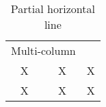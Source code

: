 \documentclass[11pt]{article}
\begin{document}
 
\begin{table}[ht]
	\caption{Partial horizontal line}
	\begin{tabular}{ccc}
    	\hline
    	\multicolumn{2}{c}{Multi-column}&\\
    	\cline{1-2}
    	X&X&X\\
    	X&X&X\\
    \hline
	\end{tabular}
\label{tab:multicol}
\end{table}
 
\end{document}
